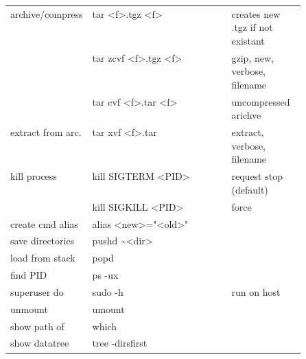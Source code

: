 {    \begin{tabularx}{\linewidth}{@{} p{0.25\linewidth}>{\ttfamily}lp{0.25\linewidth} @{}}
        archive/compress  & tar <f>.tgz <f>            & creates new .tgz if not existant \\
                          & tar zcvf <f>.tgz <f>       & gzip, new, verbose, filename     \\
                          & tar cvf <f>.tar <f>        & uncompressed arichve             \\
        extract from arc. & tar xvf <f>.tar            & extract, verbose, filename       \\
        kill process      & kill SIGTERM <PID>         & request stop (default)           \\
                          & kill SIGKILL <PID>         & force                            \\
        create cmd alias  & alias <new>="<old>"        &                                  \\
        save directories  & pushd \textasciitilde<dir> &                                  \\
        load from stack   & popd                       &                                  \\
        find PID          & ps -ux                     &                                  \\
        superuser do      & sudo -h                    & run on host                      \\
        unmount           & umount                     &                                  \\
        show path of      & which                      &                                  \\
        show datatree     & tree -dirsfirst            &                                  \\
        \bottomrule
    \end{tabularx}
} %
\renewcommand{\arraystretch}{1}
\setlength\tabcolsep{6pt} %



